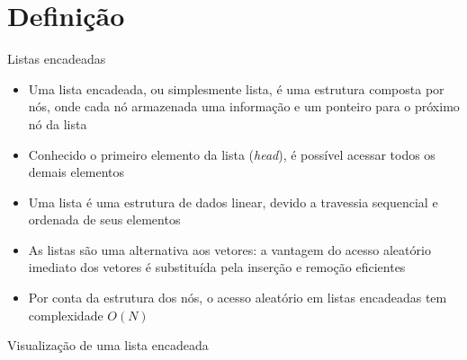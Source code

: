 \section{Definição}

\begin{frame}[fragile]{Listas encadeadas}

    \begin{itemize}
        \item Uma lista encadeada, ou simplesmente lista, é uma estrutura composta por nós,
            onde cada nó armazenada uma informação e um ponteiro para o próximo nó da lista

        \item Conhecido o primeiro elemento da lista (\textit{head}), é possível acessar todos
            os demais elementos

        \item Uma lista é uma estrutura de dados linear, devido a travessia sequencial e ordenada
            de seus elementos

        \item As listas são uma alternativa aos vetores: a vantagem do acesso aleatório imediato dos
            vetores é substituída pela inserção e remoção eficientes

        \item Por conta da estrutura dos nós, o acesso aleatório em listas encadeadas tem
            complexidade $O(N)$

    \end{itemize}

\end{frame}

\begin{frame}[fragile]{Visualização de uma lista encadeada}


\end{frame}

